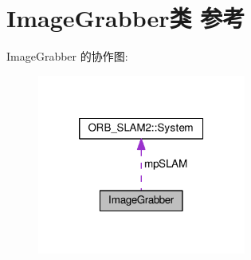 \hypertarget{classImageGrabber}{\section{Image\-Grabber类 参考}
\label{classImageGrabber}
}


Image\-Grabber 的协作图\-:
\nopagebreak
\begin{figure}[H]
\begin{center}
\leavevmode
\includegraphics[width=194pt]{classImageGrabber__coll__graph}
\end{center}
\end{figure}
